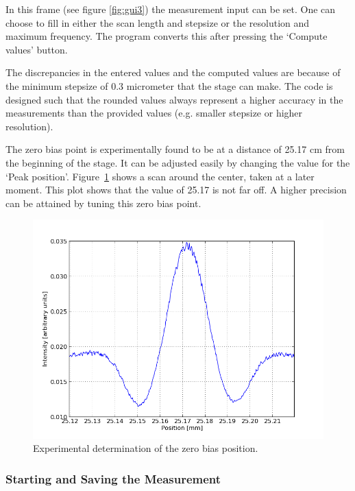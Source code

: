 In this frame (see figure \ref{fig:gui3}) the measurement input can be set. One can choose to fill in either the scan length and stepsize or the resolution and maximum frequency. The program converts this after pressing the `Compute values' button.

The discrepancies in the entered values and the computed values are because of the minimum stepsize of 0.3 micrometer that the stage can make. The code is designed such that the rounded values always represent a higher accuracy in the measurements than the provided values (e.g. smaller stepsize or higher resolution).

The zero bias point is experimentally found to be at a distance of 25.17 cm from the beginning of the stage. It can be adjusted easily by changing the value for the `Peak position'. Figure~\ref{fig:peakposition} shows a scan around the center, taken at a later moment. This plot shows that the value of 25.17 is not far off. A higher precision can be attained by tuning this zero bias point.

\begin{figure}[!ht]
 \begin{center}
  \includegraphics[width=\textwidth]{figures/peakposition}
  \caption{Experimental determination of the zero bias position.}
  \label{fig:peakposition}
 \end{center}
\end{figure}


\subsubsection{Starting and Saving the Measurement}\label{subsub:saving}

